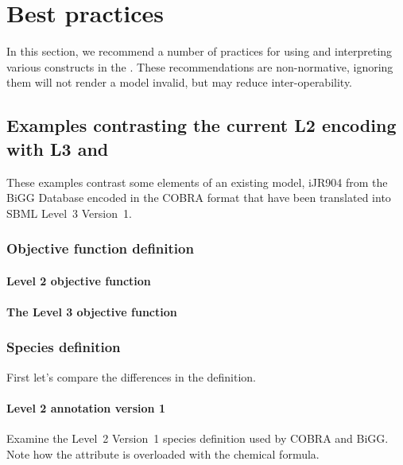 
\section{Best practices}
\label{best-practices}
\begin{newsection}

In this section, we recommend a number of practices for using and
interpreting various constructs in the \FBCPackage.
These recommendations are non-normative, ignoring them will not render a model invalid, but may reduce inter-operability.

\subsection{Examples contrasting the current \SBML L2 encoding with L3 and \FBC}
These examples contrast some elements of an existing model, iJR904 from the \textsf{BiGG} Database encoded in the \textsf{COBRA} format \citep{ijr904, bigg, cobra} that have been translated into SBML Level~3 Version~1. 

\subsubsection*{Objective function definition}
\paragraph{\SBML Level 2 objective function}

\paragraph{The \SBML Level 3 objective function}
\protect{}

\subsubsection*{Species definition}
First let's compare the differences in the \Species definition.

\paragraph{\SBML Level 2 \Species annotation version 1}
Examine the \SBML Level~2 Version~1 species definition used by COBRA and BiGG. Note how the  attribute is overloaded with the chemical formula.
%


\end{newsection}
